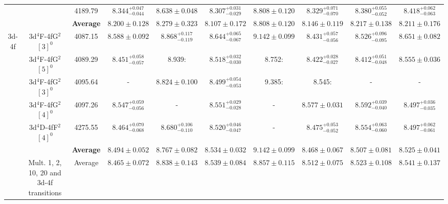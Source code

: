 \documentclass[fleqn,usenatbib]{mnras}
\begin{document}
\begin{sidewaystable*}
\begin{tabular}{cccccccccc}
&&4189.79 & $8.344^{+0.047} _{-0.044}$ & $8.638 \pm 0.048 $ & $8.307^{+0.031} _{-0.029}$ & $8.808 \pm 0.120 $ & $8.329^{+0.071} _{-0.070}$ & $8.380^{+0.055} _{-0.052}$ & $8.418^{+0.062} _{-0.063}$   \\
&&\textbf{Average} & $8.200 \pm 0.128$ &  $8.279 \pm 0.323$ & $8.107 \pm 0.172$ & $8.808 \pm 0.120 $  &$8.146 \pm 0.119$&$8.217 \pm 0.138$&$8.211 \pm 0.176$\\
3d-4f& 3d$^{4}$F-4fG$^{2}$$\left[3\right]^{0}$ &4087.15 & $8.588 \pm 0.092$ & $8.868^{+0.117} _{-0.119}$ & $8.644^{+0.065} _{-0.067}$ & $9.142 \pm 0.099$ & $8.431^{+0.057} _{-0.056}$ & $8.526^{+0.096} _{-0.095}$ & $8.651 \pm 0.082$  \\
&3d$^{4}$F-4fG$^{2}$$\left[5\right]^{0}$ &4089.29 & $8.451^{+0.058} _{-0.057}$ & 8.939: & $8.518^{+0.032} _{-0.030}$ & 8.752:& $8.422^{+0.028} _{-0.027}$ & $8.412^{+0.051} _{-0.048}$  & $8.555 \pm 0.036$ \\
&3d$^{4}$F-4fG$^{2}$$\left[3\right]^{0}$ &4095.64 & - & $8.824 \pm 0.100 $  & $8.499^{+0.054} _{-0.053}$ &  9.385:  & 8.545: &-&-  \\
&3d$^{4}$F-4fG$^{2}$$\left[4\right]^{0}$&4097.26 & $8.547^{+0.059} _{-0.056}$ & -& $8.551^{+0.029} _{-0.028}$ & -& $8.577 \pm 0.031$ & $8.592^{+0.039} _{-0.040}$ & $8.497^{+0.036} _{-0.035}$ \\
&3d$^{4}$D-4fF$^{2}$$\left[4\right]^{0}$ &4275.55 & $8.464^{+0.070} _{-0.068}$ &  $8.680^{+0.106} _{-0.110}$ & $8.520^{+0.046} _{-0.047}$ & - & $8.475^{+0.053} _{-0.052}$  & $8.554^{+0.063} _{-0.060}$ & $8.497^{+0.062} _{-0.061}$  \\

&&\textbf{Average} & $8.494 \pm 0.052$& $8.767 \pm 0.082$ &$8.534 \pm 0.032$& $9.142 \pm 0.099$ &$8.468 \pm 0.067$&$8.507 \pm 0.081$&$8.525 \pm 0.041$\\
&Mult. 1, 2, 10, 20 and 3d-4f transitions & Average&  $8.465 \pm 0.072$ & $8.838 \pm 0.143$ &  $8.539 \pm 0.084$ & $8.857 \pm 0.115$  & $8.512 \pm 0.075$ &$8.523 \pm 0.108$ &$8.541 \pm 0.137$ \\
\hline
\end{tabular}
\end{sidewaystable*}
\end{document}
